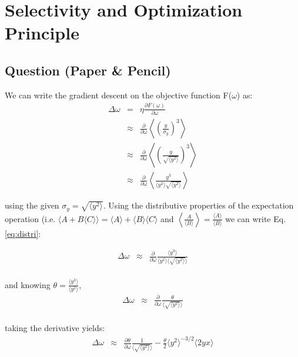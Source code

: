 \section{Selectivity and Optimization Principle}
\subsection{Question (Paper \& Pencil)} 

We can write the gradient descent on the objective function F($\omega$) as:
\begin{eqnarray}
\Delta \omega&=&\eta \frac{\partial F(\omega)}{\partial \omega} \\
&\approx&\frac{\partial }{\partial \omega} \left\langle \left(\frac{y}{\sigma_y}\right)^3 \right\rangle \\
&\approx&\frac{\partial }{\partial \omega} \left\langle \left(\frac{y}{\sqrt{\langle y^2\rangle}}\right)^3 \right\rangle \\
&\approx&\frac{\partial }{\partial \omega} \left\langle \frac{y^3}{\langle y^2\rangle  \sqrt{\langle y^2\rangle}} \right\rangle
\end{eqnarray}

using the given $\sigma_y = \sqrt{\langle y^2\rangle}$. Using the distributive properties of the expectation operation (i.e. $\langle A + B \langle C\rangle\rangle = \langle A  \rangle + \langle B\rangle \langle C\rangle$ and $\left\langle \frac{A}{\langle B\rangle}\right\rangle = \frac{\langle A  \rangle}{\langle B  \rangle}$ we can write Eq. \ref{eq:distri}: 

\begin{eqnarray}
\Delta \omega&\approx& \frac{\partial }{\partial \omega}  \frac{\langle y^3 \rangle}{\langle y^2 \rangle \langle \sqrt{\langle y^2 \rangle}\rangle}  \label{eq:distri}\\
\end{eqnarray}

and knowing $\theta = \frac{\langle y^3\rangle}{\langle y^2\rangle}$, 
\begin{eqnarray}
\Delta \omega&\approx& \frac{\partial }{\partial \omega}  \frac{\theta}{ \langle \sqrt{\langle y^2 \rangle}\rangle} \\
\end{eqnarray}

taking the derivative yields: 
\begin{eqnarray}
\Delta \omega&\approx& \frac{\partial \theta}{\partial \omega}  \frac{1}{ \langle \sqrt{\langle y^2 \rangle}\rangle} -  \frac{\theta}{2}  {\langle y^2 \rangle}^{-3/2} \langle 2y x \rangle \label{eq:delta_omega}
\end{eqnarray}

